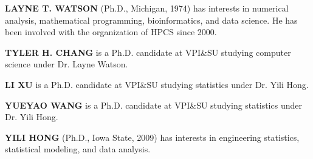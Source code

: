 \documentclass{scspaperproc}
\theoremstyle{scsthe}
\begin{document}
\textbf{\uppercase{Layne T. Watson}} (Ph.D., Michigan, 1974) has
interests in numerical analysis, mathematical programming,
bioinformatics, and data science.  He has been involved with the
organization of HPCS since 2000.

\textbf{\uppercase{Tyler H. Chang}} is a Ph.D. candidate at VPI\&SU
studying computer science under Dr. Layne Watson.

\textbf{\uppercase{Li Xu}} is a Ph.D. candidate at VPI\&SU studying
statistics under Dr. Yili Hong.

\textbf{\uppercase{Yueyao Wang}} is a Ph.D. candidate at VPI\&SU
studying statistics under Dr. Yili Hong.

\textbf{\uppercase{Yili Hong}} (Ph.D., Iowa State, 2009) has interests in
engineering statistics, statistical modeling, and data analysis.




\end{document}
